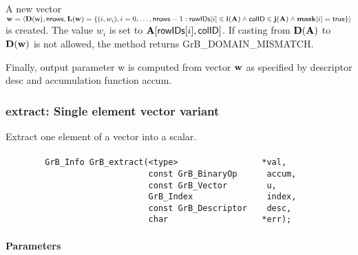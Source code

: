 A new vector ${\bf w} = \langle \bold{D}({\sf w}),{\sf nrows},
\bold{L}({\bf w}) = \{ (i,w_{i}), i = 0,\ldots,{\sf nrows}-1 : {\sf rowIDs}[i]
\in \bold{i}({\bf A}) \wedge {\sf colID} \in \bold{j}({\bf A}) \wedge {\bf mask}[i] = {\sf true} \} \rangle$
is created.  The value $w_{i}$ is set to ${\bf A}[{\sf rowIDs}[i],{\sf colID}]$. If
casting from $\bold{D}({\bf A})$ to $\bold{D}({\bf w})$ is not
allowed, the method returns {\sf GrB\_DOMAIN\_MISMATCH}.

Finally, output parameter {\sf w} is computed from vector ${\bf w}$ as
specified by descriptor {\sf desc} and accumulation function {\sf accum}.

\subsubsection{{\sf extract}: Single element vector variant}
\label{Sec:extract_single_element_vec}


Extract one element of a vector into a scalar. 

\paragraph{\syntax}

\begin{verbatim}
        GrB_Info GrB_extract(<type>                 *val,
                             const GrB_BinaryOp      accum,
                             const GrB_Vector        u,
                             GrB_Index               index,
                             const GrB_Descriptor    desc,
                             char                   *err); 
\end{verbatim}

\paragraph{Parameters}

